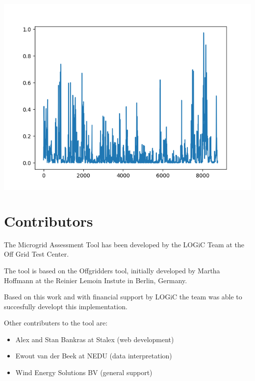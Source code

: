 \documentclass{article}
\begin{document}
\begin{multicols*}{2}
\begin{center}
\includegraphics[width=\linewidth]{per_unit_wind_generation.png}

\end{center}








\section*{Contributors}

The Microgrid Assessment Tool has been developed by the LOGiC Team at the Off Grid Test Center. 

The tool is based on the Offgridders tool, initially developed by Martha Hoffmann at the Reinier Lemoin Instute in Berlin, Germany. 

Based on this work and with financial support by LOGiC the team was able to succesfully developt this implementation. 

Other contributers to the tool are: 

\begin{itemize}

\item Alex and Stan Bankras at Stalex (web development)

\item Ewout van der Beek at NEDU (data interpretation)

\item Wind Energy Solutions BV (general support)


\end{itemize}
\end{multicols*}
\end{document}
